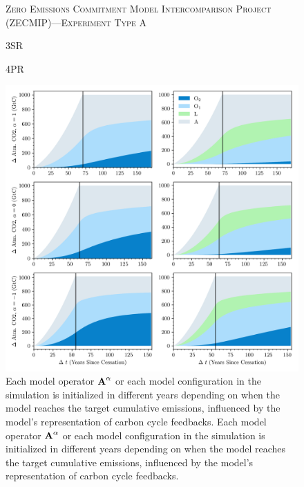\documentclass[11pt, a4paper, pdftex, twoside, dvipsnames]{article}
\newcommand{\bb}[1]{\boldsymbol{\bold{#1}}}
\begin{document}
\begin{figure}[!htbp]
    \centering
    \textsc{Zero Emissions Commitment Model Intercomparison Project (ZECMIP)---Experiment Type A}\vspace{2em}
\noindent %
\begin{minipage}{0.5\textwidth}
	\noindent
	\centering
	\hspace{3em}\small{\textsc{3SR}}
\end{minipage}%
\begin{minipage}{0.5\textwidth}
	\noindent
	\centering
	\small{\textsc{4PR}}
\end{minipage}
    \includegraphics[width=\textwidth]{fig/simulate_macdougall_absorbtion.png}
    \caption{
Each model operator $\bb{A}^\alpha$  or each model configuration in the simulation is initialized in different years depending on when the model reaches the target cumulative emissions, influenced by the model's representation of carbon cycle feedbacks.
Each model operator $\bb{A}^\alpha$  or each model configuration in the simulation is initialized in different years depending on when the model reaches the target cumulative emissions, influenced by the model's representation of carbon cycle feedbacks.
     }
    \label{fig:6}
\end{figure}
%
\newpage
\end{document}
